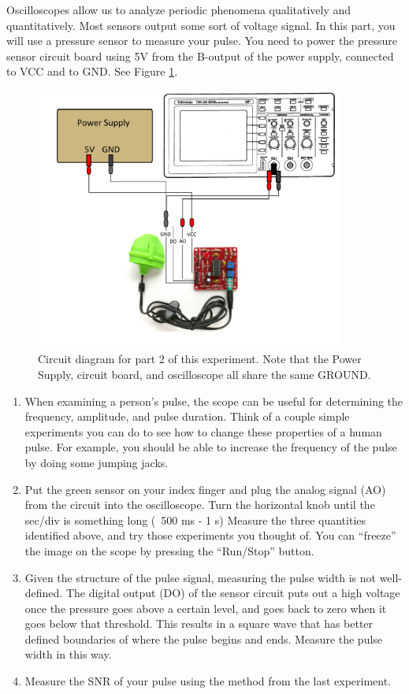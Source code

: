 Oscilloscopes allow us to analyze periodic phenomena qualitatively and quantitatively. Most sensors output some sort of voltage signal. In this part, you will use a pressure sensor to measure your pulse. You need to power the pressure sensor circuit board using 5V from the B-output of the power supply, connected to VCC and to GND. See Figure \ref{fig:part2}.

\begin{figure}[h!]
        \centering
            \includegraphics[width=0.9\textwidth]{./Exp9/pic/part2.pdf}
        \caption{Circuit diagram for part 2 of this experiment. Note that the Power Supply, circuit board, and oscilloscope all share the same GROUND.}
        \label{fig:part2}
\end{figure}

\begin{enumerate}
\item When examining a person's pulse, the scope can be useful for determining the frequency, amplitude, and pulse duration. Think of a couple simple experiments you can do to see how to change these properties of a human pulse. For example, you should be able to increase the frequency of the pulse by doing some jumping jacks.

\item Put the green sensor on your index finger and plug the analog signal (AO) from the circuit into the oscilloscope. Turn the horizontal knob until the sec/div is something long (~500 ms - 1 s) Measure the three quantities identified above, and try those experiments you thought of. You can ``freeze'' the image on the scope by pressing the ``Run/Stop'' button.

\item Given the structure of the pulse signal, measuring the pulse width is not well-defined. The digital output (DO) of the sensor circuit puts out a high voltage once the pressure goes above a certain level, and goes back to zero when it goes below that threshold. This results in a square wave that has better defined boundaries of where the pulse begins and ends. Measure the pulse width in this way.

\item Measure the SNR of your pulse using the method from the last experiment.
\end{enumerate}

